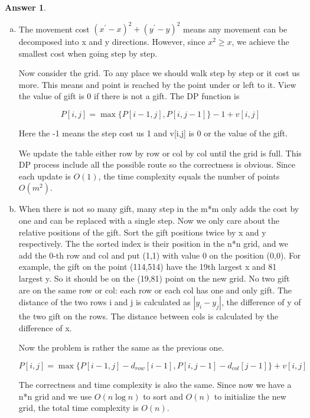 \documentclass{article}
\theoremstyle{definition}
\newtheorem{ans}{Answer}
\begin{document}
	\begin{ans}
		~
		
		\begin{enumerate}[(a)]
			\item The movement cost $\left(x^{\prime}-x\right)^{2}+\left(y^{\prime}-y\right)^{2}$ means any movement can be decomposed into x and y directions. However, since $x^2\geq x$, we achieve the smallest cost when going step by step. 
			
			Now consider the grid. To any place we should walk step by step or it cost us more. This means and point is reached by the point under or left to it. View the value of gift is 0 if there is not a gift. The DP function is
			
			$$
			P[i,j]=\max\{P[i-1, j], P[i,j-1]\}-1+v[i,j]
			$$ 
			
			Here the -1 means the step cost us 1 and v[i,j] is 0 or the value of the gift.
			
			We update the table either row by row or col by col until the grid is full. This DP process include all the possible route so the correctness is obvious. Since each update is $O(1)$, the time complexity equals the number of points $O(m^2)$.
			
			\item When there is not so many gift, many step in the m*m only adds the cost by one and can be replaced with a single step. Now we only care about the relative positions of the gift. Sort the gift positions twice by x and y respectively. The the sorted index is their position in the n*n grid, and we add the 0-th row and col and put (1,1) with value 0 on the position (0,0). For example, the gift on the point (114,514) have the 19th largest x and 81 largest y. So it should be on the (19,81) point on the new grid. No two gift are on the same row or col: each row or each col has one and only gift. The distance of the two rows i and j is calculated as $|y_i-y_j|$, the difference of y of the two gift on the rows. The distance between cols is calculated by the difference of x. 
			
			Now the problem is rather the same as the previous one. 
			
			$$
			P[i,j]=\max\{P[i-1, j]-d_{row}[i-1], P[i,j-1]-d_{col}[j-1]\}+v[i,j]
			$$ 
			
			The correctness and time complexity is also the same. Since now we have a n*n grid and we use $O(n\log n)$ to sort and $O(n)$ to initialize the new grid, the total time complexity is $O(n)$.
		\end{enumerate}
	\end{ans}
	
\end{document}

